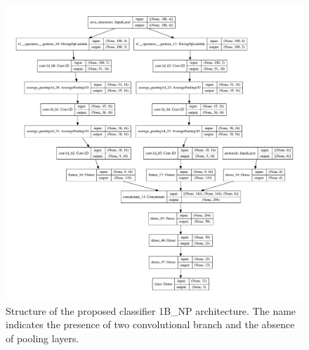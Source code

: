 \begin{figure}
\hspace{-2cm}\includegraphics[width=1.3\textwidth]{images/models/model_2bap.pdf}
\caption{{Structure of the proposed classifier 1B\_NP architecture. The name indicates the presence of two convolutional branch and the absence of pooling layers.}}    \label{fig:2bap_model}
\end{figure}




